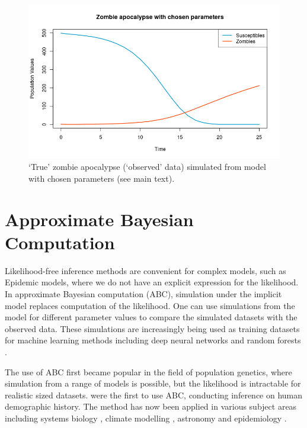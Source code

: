 \documentclass[]{article}
\begin{document}
\begin{figure}[H]
	\centering
	\includegraphics[width=0.8\linewidth]{../Figures/true_epidemic}
	\caption{`True' zombie apocalypse (`observed' data) simulated from model with chosen parameters (see main text).}
	\label{true_epidemic}
\end{figure}

\section{Approximate Bayesian Computation}

Likelihood-free inference methods are convenient for complex models, such as Epidemic models, where we do not have an explicit expression for the likelihood. In approximate Bayesian computation (ABC), simulation under the implicit model replaces computation of the likelihood. One can use simulations from the model for different parameter values to compare the simulated datasets with the observed data. These simulations are increasingly being used as training datasets for machine learning methods including deep neural networks \citep{RN6} and random forests \citep{RN8}. 

The use of ABC first became popular in the field of population genetics, where simulation from a range of models is possible, but the likelihood is intractable for realistic sized datasets. \cite{RN57} were the first to use ABC, conducting inference on human demographic history. The method has now been applied in various subject areas including systems biology \citep{RN60}, climate modelling \citep{RN61}, astronomy \citep{RN62} and epidemiology \citep{RN10}.
\end{document}
